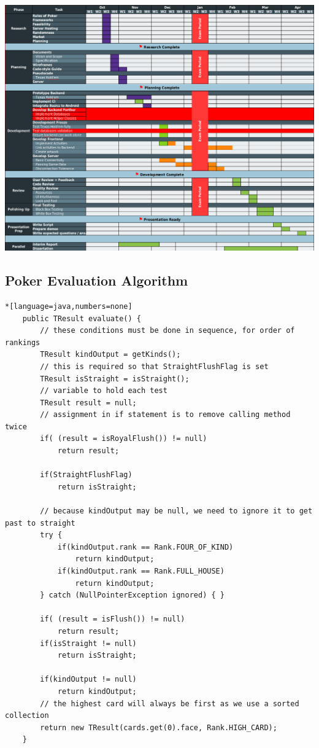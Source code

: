 \documentclass[11pt]{article}
\begin{document}
\includegraphics[width=\textwidth]{modified_gantt}

\newpage
\subsection{Poker Evaluation Algorithm}
\hypertarget{app_eval}{}
\begin{lstlisting}*[language=java,numbers=none]
    public TResult evaluate() {
        // these conditions must be done in sequence, for order of rankings
        TResult kindOutput = getKinds();
        // this is required so that StraightFlushFlag is set
        TResult isStraight = isStraight();
        // variable to hold each test
        TResult result = null;
        // assignment in if statement is to remove calling method twice
        if( (result = isRoyalFlush()) != null)
            return result;

        if(StraightFlushFlag)
            return isStraight;

        // because kindOutput may be null, we need to ignore it to get past to straight
        try {
            if(kindOutput.rank == Rank.FOUR_OF_KIND)
                return kindOutput;
            if(kindOutput.rank == Rank.FULL_HOUSE)
                return kindOutput;
        } catch (NullPointerException ignored) { }

        if( (result = isFlush()) != null)
            return result;
        if(isStraight != null)
            return isStraight;
       
        if(kindOutput != null)
            return kindOutput;
        // the highest card will always be first as we use a sorted collection
        return new TResult(cards.get(0).face, Rank.HIGH_CARD);
    }
\end{lstlisting}
\end{document}
